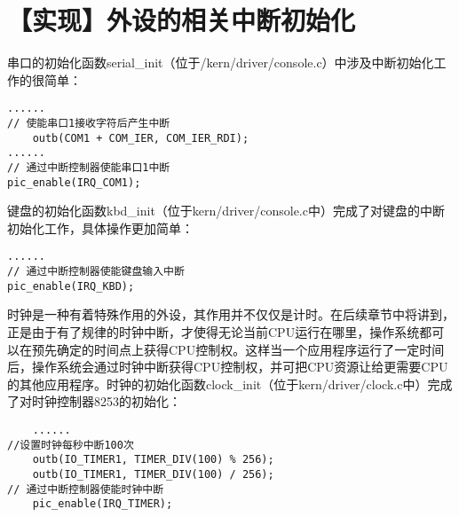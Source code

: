 \section{【实现】外设的相关中断初始化}\label{ux5b9eux73b0ux5916ux8bbeux7684ux76f8ux5173ux4e2dux65adux521dux59cbux5316}

串口的初始化函数serial\_init（位于/kern/driver/console.c）中涉及中断初始化工作的很简单：

\begin{lstlisting}
......
// 使能串口1接收字符后产生中断
    outb(COM1 + COM_IER, COM_IER_RDI);
......
// 通过中断控制器使能串口1中断
pic_enable(IRQ_COM1);
\end{lstlisting}

键盘的初始化函数kbd\_init（位于kern/driver/console.c中）完成了对键盘的中断初始化工作，具体操作更加简单：

\begin{lstlisting}
......
// 通过中断控制器使能键盘输入中断
pic_enable(IRQ_KBD);
\end{lstlisting}

时钟是一种有着特殊作用的外设，其作用并不仅仅是计时。在后续章节中将讲到，正是由于有了规律的时钟中断，才使得无论当前CPU运行在哪里，操作系统都可以在预先确定的时间点上获得CPU控制权。这样当一个应用程序运行了一定时间后，操作系统会通过时钟中断获得CPU控制权，并可把CPU资源让给更需要CPU的其他应用程序。时钟的初始化函数clock\_init（位于kern/driver/clock.c中）完成了对时钟控制器8253的初始化：

\begin{lstlisting}
    ......
//设置时钟每秒中断100次
    outb(IO_TIMER1, TIMER_DIV(100) % 256);
    outb(IO_TIMER1, TIMER_DIV(100) / 256);
// 通过中断控制器使能时钟中断
    pic_enable(IRQ_TIMER);
\end{lstlisting}

